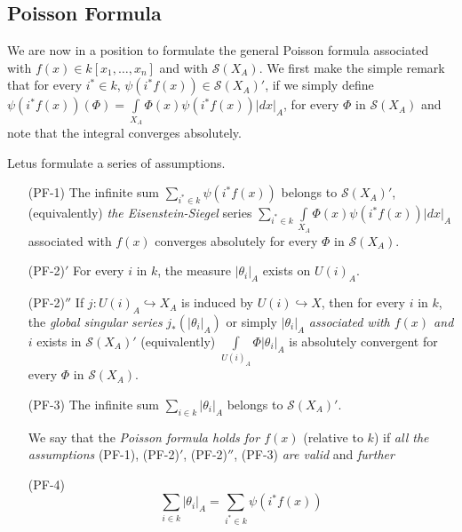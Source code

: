 \subsection{Poisson Formula}\label{chap4:sec1:subsec6} %

We are now in a position to formulate the general Poisson formula
associated with $f(x)\in k[x_{1},\ldots,x_{n}]$ and with
$\mathscr{S}(X_{A})$. We first make the simple remark that for every
$i^{\ast}\in k$, $\psi(i^{\ast}f(x))\in\mathscr{S}(X_{A})'$, if we simply
define
$\psi(i^{\ast}f(x))(\Phi)=\int\limits_{X_{A}}\Phi(x)\psi(i^{\ast}f(x))|dx|_{A}$,
for every $\Phi$ in $\mathscr{S}(X_{A})$ and note that the integral
converges absolutely.

Let\pageoriginale us formulate a series of assumptions.
\begin{itemize}
\item[(PF-1)] The infinite sum $\sum\limits_{i^{\ast}\in k}\psi(i^{\ast}f(x))$
  belongs to $\mathscr{S}(X_{A})'$, \ie (equi\break valently) {\em the
    Eisenstein-Siegel} series $\sum\limits_{i^{\ast}\in
    k}\int\limits_{X_{A}}\Phi(x)\psi(i^{\ast}f(x))|dx|_{A}$ associated
  with $f(x)$ converges absolutely for every $\Phi$ in
  $\mathscr{S}(X_{A})$.

\item[(PF-2)$'$] For every $i$ in $k$, the measure $|\theta_{i}|_{A}$
  exists on $U(i)_{A}$.

\item[(PF-2)$''$] If $j:U(i)_{A}\hookrightarrow X_{A}$ is induced by
  $U(i)\hookrightarrow X$, then for every $i$ in $k$, the {\em global
  singular series} $j_{\ast}(|\theta_{i}|_{A})$ or simply
  $|\theta_{i}|_{A}$ {\em associated with $f(x)$ and} $i$ exists in
  $\mathscr{S}(X_{A})'$ \ie (equivalently)
  $\int\limits_{U(i)_{A}}\Phi|\theta_{i}|_{A}$ is absolutely
  convergent for every $\Phi$ in $\mathscr{S}(X_{A})$.

\item[(PF-3)] The infinite sum $\sum\limits_{i\in k}|\theta_{i}|_{A}$
  belongs to $\mathscr{S}(X_{A})'$. 
  
  We say that the {\em Poisson formula holds for $f(x)$} (relative to
  $k$) if {\em all the assumptions} (PF-1), (PF-2)$'$, (PF-2)$''$,
  (PF-3) {\em are valid} and {\em further}
\item[(PF-4)]
  \begin{equation*}
    \sum_{i\in k}|\theta_{i}|_{A}=\sum_{i^{\ast}\in
      k}\psi(i^{\ast}f(x))\tag{114}\label{chap4:sec1:subsec6:eq114}
  \end{equation*}
\end{itemize}

